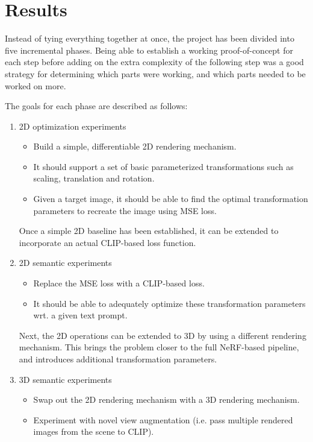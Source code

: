 \chapter{Results}
\label{chapter:results}
Instead of tying everything together at once, the project has been divided into five incremental phases. Being able to establish a working proof-of-concept for each step before adding on the extra complexity of the following step was a good strategy for determining which parts were working, and which parts needed to be worked on more.

The goals for each phase are described as follows:
\begin{enumerate}
    \item 2D optimization experiments
    \begin{itemize}[noitemsep]
        \item Build a simple, differentiable 2D rendering mechanism.
        \item It should support a set of basic parameterized transformations such as scaling, translation and rotation.
        \item Given a target image, it should be able to find the optimal transformation parameters to recreate the image using MSE loss.
    \end{itemize}
    
    Once a simple 2D baseline has been established, it can be extended to incorporate an actual CLIP-based loss function.
    \item 2D semantic experiments
    \begin{itemize}[noitemsep]
        \item Replace the MSE loss with a CLIP-based loss.
        \item It should be able to adequately optimize these transformation parameters wrt. a given text prompt.
    \end{itemize}

    Next, the 2D operations can be extended to 3D by using a different rendering mechanism. This brings the problem closer to the full NeRF-based pipeline, and introduces additional transformation parameters.
    \item 3D semantic experiments
    \begin{itemize}[noitemsep]
        \item Swap out the 2D rendering mechanism with a 3D rendering mechanism.
        \item Experiment with novel view augmentation (i.e. pass multiple rendered images from the scene to CLIP).
    \end{itemize}
    

\end{enumerate}
